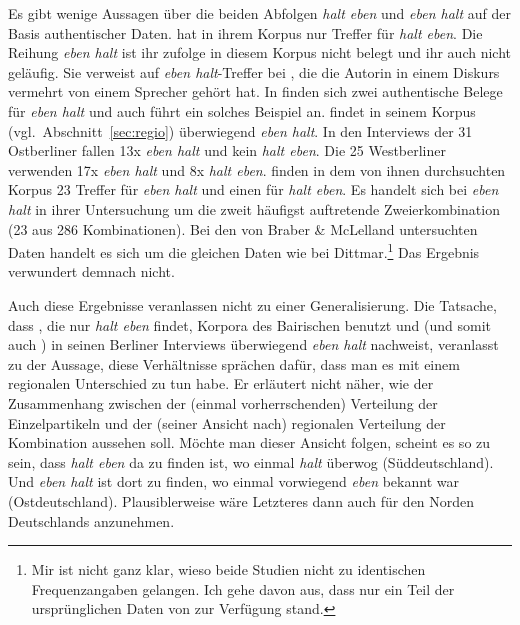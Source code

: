 Es gibt wenige Aussagen über die beiden Abfolgen \textit{halt eben} und \textit{eben halt} auf der Basis authentischer Daten. \citet[257, Fn 32]{Thurmair1989} hat in ihrem Korpus nur Treffer für \textit{halt eben}. Die Reihung \textit{eben halt} ist ihr zufolge in diesem Korpus nicht belegt und ihr auch nicht geläufig. Sie verweist auf \textit{eben halt}-Treffer bei \citet[256]{Hentschel1986}, die die Autorin in einem Diskurs vermehrt von einem Sprecher gehört hat. In \citet[78]{Hartog1982} finden sich zwei authenti\-sche Belege für \textit{eben halt} und auch \citet[310]{Rost-Roth1998} führt ein solches Beispiel an. \citet[221]{Dittmar2000} findet in seinem Korpus (vgl.\ Abschnitt~\ref{sec:regio}) überwiegend \textit{eben halt}. In den Interviews der 31 Ostberliner fallen 13x \textit{eben halt} und kein \textit{halt eben}. Die 25 Westberliner verwenden 17x \textit{eben halt} und 8x \textit{halt eben}. \citet[468]{Braber2010} finden in dem von ihnen durchsuchten Korpus 23 Tref\-fer für \textit{eben halt} und einen für \textit{halt eben}. Es handelt sich bei \textit{eben halt} in ihrer Untersuchung um die zweit häufigst auftretende Zweierkombination (23 aus 286 Kombinationen). Bei den von Braber \& McLelland untersuchten Daten handelt es sich um die gleichen Daten wie bei Dittmar.\footnote{ Mir ist nicht ganz klar, wieso beide Studien nicht zu identischen Frequenzangaben gelangen. Ich gehe davon aus, dass \citet{Braber2010} nur ein Teil der ursprünglichen Daten von \citet{Dittmar2000} zur Verfügung stand.} Das Ergebnis verwundert demnach nicht. 

Auch diese Ergebnisse veranlassen nicht zu einer Generalisierung. Die Tatsache, dass \citet{Thurmair1989}, die nur \textit{halt eben} findet, Korpora des Bairischen benutzt und \citet[224]{Dittmar2000} (und somit auch \citealt{Braber2010}) in seinen Berliner Interviews überwiegend \textit{eben halt} nachweist, veranlasst \citet[17, Fn 41]{Elspass2005} zu der Aussage, diese Verhältnisse sprächen dafür, dass man es mit einem regionalen Unterschied zu tun habe. Er erläutert nicht näher, wie der Zusammenhang zwischen der (einmal vorherrschenden) Verteilung der Einzelpartikeln und der (seiner Ansicht nach) regionalen Verteilung der Kombination aussehen soll. Möchte man dieser Ansicht folgen, scheint es so zu sein, dass \textit{halt eben} da zu finden ist, wo einmal \textit{halt} überwog (Süddeutschland). Und \textit{eben halt} ist dort zu finden, wo einmal vorwiegend \textit{eben} bekannt war (Ostdeutschland). Plausiblerweise wäre Letzteres dann auch für den Norden Deutschlands anzunehmen.

